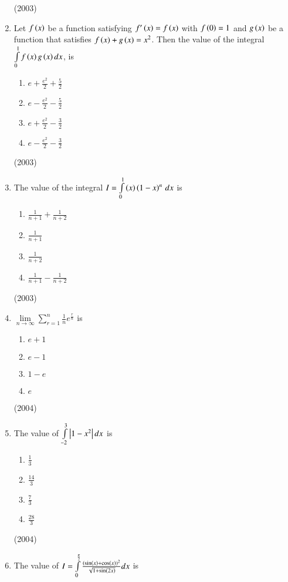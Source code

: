 \documentclass[journal,12pt,twocolumn]{IEEEtran}
\theoremstyle{remark}
\begin{document}
\begin{enumerate}
			\hfill (2003)
	\item 
		Let $f\left(x\right)$ be a function satisfying $f^{\prime}\left(x\right) = f\left(x\right)$ with $f\left(0\right)=1$ and $g\left(x\right)$ be a function that satisfies $f\left(x\right) + g\left(x\right)=x^2$. Then the value of the integral $\int \limits_0^1 f\left(x\right)g\left(x\right)dx$, is
			\begin {enumerate}
				\itemsep0.4em
				\item $e+ \frac{e^2}{2} + \frac{5}{2}$
				\item $e- \frac{e^2}{2} - \frac{5}{2}$
				\item $e+ \frac{e^2}{2} - \frac{3}{2}$
				\item $e- \frac{e^2}{2} - \frac{3}{2}$
			\end {enumerate}
			\hfill (2003)
	\item
		The value of the integral $I = \int \limits_0^1 \left(x\right)\left(1-x\right)^n \, dx$ is
			\begin{enumerate}
				\itemsep0.5em
				\item $\frac{1}{n+1} + \frac{1}{n+2}$
				\item $\frac{1}{n+1}$
				\item $\frac{1}{n+2}$
				\item $\frac{1}{n+1} - \frac{1}{n+2}$
			\end{enumerate}
			\hfill (2003)
	\item
		$\lim \limits_{n \to \infty} \sum \limits_{r=1}^{n} \frac{1}{n} e^{\frac{r}{n}}$ is
			\begin{enumerate}
				\item $e+1$
				\item $e-1$
				\item $1-e$
				\item $e$	
			\end{enumerate}
			\hfill (2004)
	\item 
		The value of $\int \limits_{-2}^{3} \left\vert1-x^2\right\vert dx$ is 
			\begin{enumerate}
				\itemsep0.4em
				\item $\frac{1}{3}$
				\item $\frac{14}{3}$
				\item $\frac{7}{3}$
				\item $\frac{28}{3}$
			\end{enumerate}
			\hfill (2004)
	\item
		The value of $I = \int \limits_0^{\frac{\pi}{2}} \frac{(\sin \left(x\right) + \cos \left(x\right))^2}{\sqrt{1+ \sin \left(2x\right)}} dx$ is
			\begin{enumerate}

\end{enumerate}
\end{enumerate}
\end{document}
